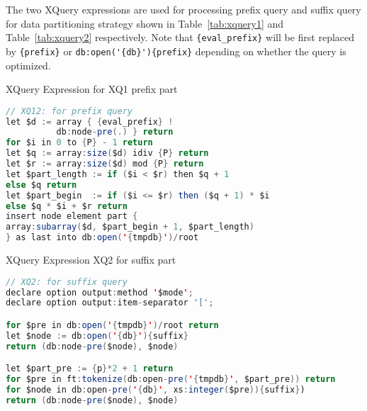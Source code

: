 The two XQuery expressions are used for processing prefix query 
and suffix query for data partitioning strategy shown in Table~\ref{tab:xquery1}
and Table~\ref{tab:xquery2} respectively.
Note that \verb|{eval_prefix}| will be first replaced by \verb|{prefix}| or
\verb|db:open('{db}'){prefix}| depending on whether the query is optimized. 

\begin{table}
\centering
\label{tab:xquery1}
\caption{XQuery Expression for XQ1 prefix part}
  \footnotesize
\begin{lstlisting}[language=java,frame=single]
// XQ12: for prefix query 
let $d := array { {eval_prefix} ! 
          db:node-pre(.) } return
for $i in 0 to {P} - 1 return
let $q := array:size($d) idiv {P} return
let $r := array:size($d) mod {P} return
let $part_length := if ($i < $r) then $q + 1
else $q return
let $part_begin  := if ($i <= $r) then ($q + 1) * $i
else $q * $i + $r return
insert node element part {
array:subarray($d, $part_begin + 1, $part_length)
} as last into db:open('{tmpdb}')/root
\end{lstlisting}
\end{table}
 

\begin{table}
	\centering
	\label{tab:xquery2}
	\caption{XQuery Expression XQ2 for suffix part}

  \footnotesize
\begin{lstlisting}[language=java,frame=single]
// XQ2: for suffix query 
declare option output:method '$mode';
declare option output:item-separator '[';

for $pre in db:open('{tmpdb}')/root return
let $node := db:open('{db}'){suffix}
return (db:node-pre($node), $node)

let $part_pre := {p}*2 + 1 return
for $pre in ft:tokenize(db:open-pre('{tmpdb}', $part_pre)) return
for $node in db:open-pre('{db}', xs:integer($pre)){suffix})
return (db:node-pre($node), $node) 
\end{lstlisting}
\end{table}


 